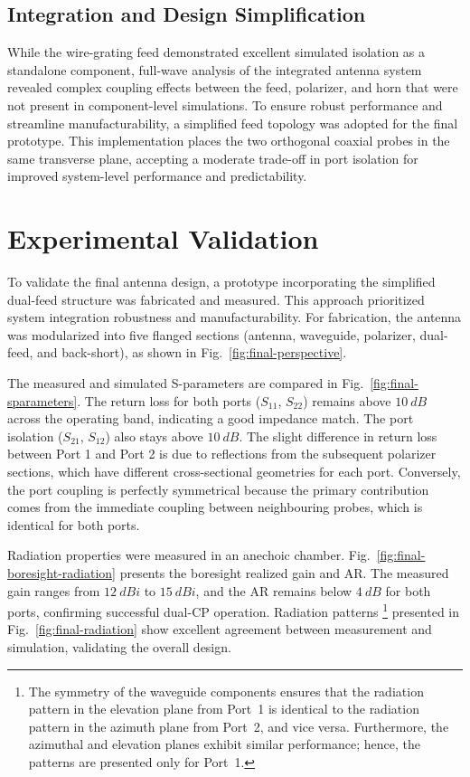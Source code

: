 \documentclass[journal,9pt]{IEEEtran}
\begin{document}
\subsection{Integration and Design Simplification}

While the wire-grating feed demonstrated excellent simulated isolation as a standalone component, full-wave analysis of the integrated antenna system revealed complex coupling effects between the feed, polarizer, and horn that were not present in component-level simulations. To ensure robust performance and streamline manufacturability, a simplified feed topology was adopted for the final prototype. This implementation places the two orthogonal coaxial probes in the same transverse plane, accepting a moderate trade-off in port isolation for improved system-level performance and predictability.


\section{Experimental Validation}
\label{sec:experimental-validation}

To validate the final antenna design, a prototype incorporating the simplified dual-feed structure was fabricated and measured. This approach prioritized system integration robustness and manufacturability. For fabrication, the antenna was modularized into five flanged sections (antenna, waveguide, polarizer, dual-feed, and back-short), as shown in Fig.~\ref{fig:final-perspective}.

The measured and simulated S-parameters are compared in Fig.~\ref{fig:final-sparameters}. The return loss for both ports ($S_{11}$, $S_{22}$) remains above $\qty{10}{dB}$ across the operating band, indicating a good impedance match. The port isolation ($S_{21}$, $S_{12}$) also stays above $\qty{10}{dB}$. The slight difference in return loss between Port 1 and Port 2 is due to reflections from the subsequent polarizer sections, which have different cross-sectional geometries for each port. Conversely, the port coupling is perfectly symmetrical because the primary contribution comes from the immediate coupling between neighbouring probes, which is identical for both ports.

Radiation properties were measured in an anechoic chamber. Fig.~\ref{fig:final-boresight-radiation} presents the boresight realized gain and AR. The measured gain ranges from $\qty{12}{dBi}$ to $\qty{15}{dBi}$, and the AR remains below $\qty{4}{dB}$ for both ports, confirming successful dual-CP operation. Radiation patterns%
    \footnote{The symmetry of the waveguide components ensures that the radiation pattern in the elevation plane from Port~1 is identical to the radiation pattern in the azimuth plane from Port~2, and vice versa. Furthermore, the azimuthal and elevation planes exhibit similar performance; hence, the patterns are presented only for Port~1.}
presented in Fig.~\ref{fig:final-radiation} show excellent agreement between measurement and simulation, validating the overall design.
\end{document}
